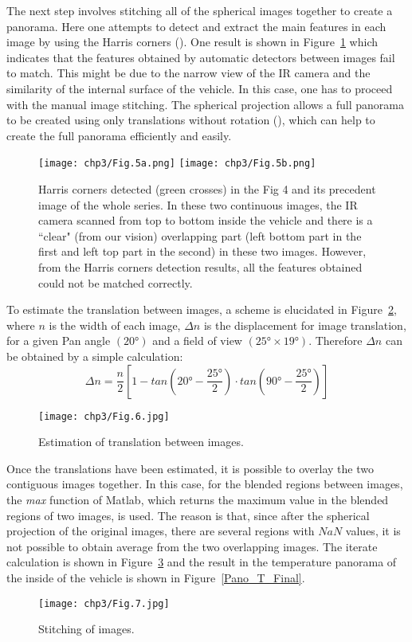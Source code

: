 The next step involves stitching all of the spherical images together to create a panorama. Here one attempts to detect and extract the main features in each image by using the Harris corners (\citet{Harris1988}). One result is shown in Figure~\ref{Harris} which indicates that the features obtained by automatic detectors between images fail to match. This might be due to the narrow view of the IR camera and the similarity of the internal surface of the vehicle. In this case, one has to proceed with the manual image stitching.  The spherical projection allows a full panorama to be created using only translations without rotation (\citet{Szeliski1997}), which can help to create the full panorama efficiently and easily.
\begin{figure}[ht]
    \texttt{[image: chp3/Fig.5a.png]}
    \texttt{[image: chp3/Fig.5b.png]}
    \caption{Harris corners detected (green crosses) in the Fig 4 and its precedent image of the whole series. In these two continuous images, the IR camera scanned from top to bottom inside the vehicle and there is a ``clear" (from our vision) overlapping part (left bottom part in the first and left top part in the second) in these two images. However, from the Harris corners detection results, all the features obtained could not be matched correctly.}
    \label{Harris}
\end{figure}

To estimate the translation between images, a scheme is elucidated in Figure~\ref{Trans}, where $ n $ is the width of each image, $ \Delta n $ is the displacement for image translation, for a given Pan angle $ (20°) $ and a field of view $ (25° \times 19°) $. Therefore $ \Delta n $ can be obtained by a simple calculation:
\begin{equation}
\Delta n=\dfrac{n}{2}[1-tan(20°-\dfrac{25°}{2})\cdot tan(90°-\dfrac{25°}{2})]
\end{equation}

\begin{figure}[ht]
    \centering
    \texttt{[image: chp3/Fig.6.jpg]}
    \caption{ Estimation of translation between images.}
    \label{Trans}
\end{figure}

Once the translations have been estimated, it is possible to overlay the two contiguous images together. In this case, for the blended regions between images, the \textit{max} function of Matlab, which returns the maximum value in the blended regions of two images, is used. The reason is that, since after the spherical projection of the original images, there are several regions with $ NaN $ values, it is not possible to obtain average from the two overlapping images. The iterate calculation is shown in Figure~\ref{img_sti} and the result in the temperature panorama of the inside of the vehicle is shown in Figure~\ref{Pano_T_Final}.
\begin{figure}[ht]
    \centering
    \texttt{[image: chp3/Fig.7.jpg]}
    \caption{Stitching of images.}
    \label{img_sti}
\end{figure}


